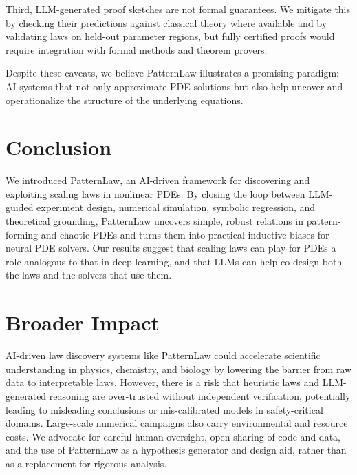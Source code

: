 \documentclass{article}
\theoremstyle{plain}
\theoremstyle{definition}
\theoremstyle{remark}
\begin{document}
Third, LLM-generated proof sketches are not formal guarantees. We mitigate this by checking their predictions against classical theory where available and by validating laws on held-out parameter regions, but fully certified proofs would require integration with formal methods and theorem provers.

Despite these caveats, we believe PatternLaw illustrates a promising paradigm: AI systems that not only approximate PDE solutions but also help uncover and operationalize the structure of the underlying equations.

\section{Conclusion}

We introduced PatternLaw, an AI-driven framework for discovering and exploiting scaling laws in nonlinear PDEs. By closing the loop between LLM-guided experiment design, numerical simulation, symbolic regression, and theoretical grounding, PatternLaw uncovers simple, robust relations in pattern-forming and chaotic PDEs and turns them into practical inductive biases for neural PDE solvers. Our results suggest that scaling laws can play for PDEs a role analogous to that in deep learning, and that LLMs can help co-design both the laws and the solvers that use them.

\section*{Broader Impact}

AI-driven law discovery systems like PatternLaw could accelerate scientific understanding in physics, chemistry, and biology by lowering the barrier from raw data to interpretable laws. However, there is a risk that heuristic laws and LLM-generated reasoning are over-trusted without independent verification, potentially leading to misleading conclusions or mis-calibrated models in safety-critical domains. Large-scale numerical campaigns also carry environmental and resource costs. We advocate for careful human oversight, open sharing of code and data, and the use of PatternLaw as a hypothesis generator and design aid, rather than as a replacement for rigorous analysis.
\end{document}
